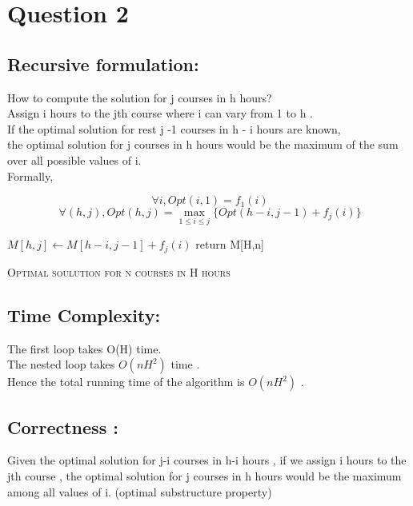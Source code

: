 \documentclass[11pt]{article}
\begin{document}
\section*{Question 2}

\subsection*{Recursive formulation:}
How to compute the solution for j courses in h hours? \\

Assign i hours to the jth course where i can vary from 1 to h . \\

If the optimal solution for rest j -1 courses in h - i hours are known, \\

the optimal solution for j courses in h hours would be the maximum of the sum over all possible values of i. \\

Formally, 

\[
\  \forall i , Opt(i,1) = f_1(i)
\]
\[
\ \forall (h,j) ,  Opt(h,j) = \max_{1 \leq i \leq j} \{ Opt(h-i,j-1) + f_{j}(i) \} 
\]

\begin{algorithm}
 {
	 {
		 {
			 {
				$M[h,j] \leftarrow M[h-i,j-1] + f_j(i)$
				}
			}
	} 
}
return M[H,n]
\caption{\textsc{Optimal soulution for n courses in H hours}}
\label{UID}
\end{algorithm}

\subsection*{Time Complexity:}

The first loop takes O(H) time. \\

The nested loop takes $O(nH^2)$ time . \\

Hence the total running time of the algorithm is $O(nH^2)$ . \\

\subsection*{Correctness :}

Given the optimal solution for j-i courses in h-i hours , if we assign i hours to the jth course , the optimal solution for j courses in h hours would be the maximum among all values of i. (optimal substructure property)
\end{document}

